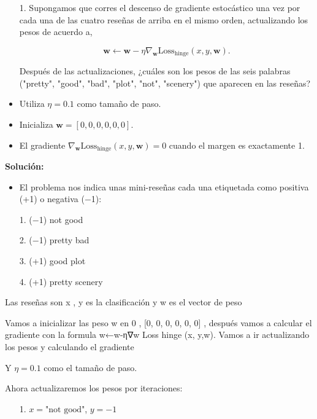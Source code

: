 \documentclass[11pt,letterpaper]{article}
\newenvironment{solution}{%
  \noindent\begin{shaded}
  \textbf{Solución:}\ }{
  \end{shaded}%
}
\begin{document}
\begin{enumerate}
\begin{itemize}
    \item[1.]
    Supongamos que corres el descenso de gradiente estocástico una vez por cada una de las cuatro reseñas de arriba en el mismo orden, actualizando los pesos de acuerdo a,

    \[ \mathbf{w} \leftarrow \mathbf{w} - \eta \nabla_{\mathbf{w}} \text{Loss}_{\text{hinge}}(x, y, \mathbf{w}). \]

    Después de las actualizaciones, ¿cuáles son los pesos de las seis palabras ("pretty", "good", "bad", "plot", "not", "scenery") que aparecen en las reseñas?
    
    \item Utiliza $\eta = 0.1$ como tamaño de paso.
    \item Inicializa $\mathbf{w} = [0, 0, 0, 0, 0, 0]$.
    \item El gradiente $\nabla_{\mathbf{w}}\text{Loss}_{\text{hinge}}(x, y, \mathbf{w}) = 0$ cuando el margen es exactamente 1.
\end{itemize}
  \begin{solution}
\begin{itemize}
    \item El problema nos indica unas mini-reseñas cada una etiquetada como positiva (+1) o negativa (−1):

1. (−1) not good

2. (−1) pretty bad

3. (+1) good plot

4. (+1) pretty scenery

\end{itemize}

Las reseñas son x , y es la clasificación y w es el vector de peso

Vamos a inicializar las peso w en 0 , [0, 0, 0, 0, 0, 0] , después vamos a calcular el gradiente con la formula w←w-η∇w Loss hinge (x, y,w). Vamos a ir actualizando los pesos y calculando el gradiente 


Y \(\eta = 0.1\) como el tamaño de paso.

Ahora actualizaremos los pesos por iteraciones:

\begin{enumerate}
    \item[1.] \(x = \text{"not good"}\), \(y = -1\) \\
    

\end{enumerate}
\end{solution}
\end{enumerate}
\end{document}
